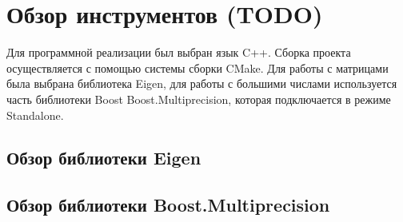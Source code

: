 \newpage

\section{Обзор инструментов (TODO)}

Для программной реализации был выбран язык C++. Сборка проекта осуществляется с помощью системы сборки CMake. Для работы с матрицами была выбрана библиотека Eigen, для работы с большими числами используется часть библиотеки Boost Boost.Multiprecision, которая подключается в режиме Standalone.

\subsection{Обзор библиотеки Eigen}

\subsection{Обзор библиотеки Boost.Multiprecision}

\clearpage